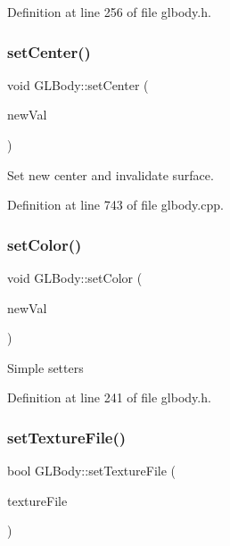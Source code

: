 Definition at line 256 of file glbody.\+h.

\mbox{\label{class_g_l_body_abb97f9928110d5bcd47c4488e92ac78e}} 
\subsubsection{\texorpdfstring{setCenter()}{setCenter()}}
{\footnotesize\ttfamily void G\+L\+Body\+::set\+Center (\begin{DoxyParamCaption}\item[{const Q\+Vector3D \&}]{new\+Val }\end{DoxyParamCaption})}

Set new center and invalidate surface. 

Definition at line 743 of file glbody.\+cpp.

\mbox{\label{class_g_l_body_a6101fd66bc1bfcd8dabed690b87c0d78}} 
\subsubsection{\texorpdfstring{setColor()}{setColor()}}
{\footnotesize\ttfamily void G\+L\+Body\+::set\+Color (\begin{DoxyParamCaption}\item[{const \mbox{\hyperlink{class_g_l_color_rgba}{G\+L\+Color\+Rgba}} \&}]{new\+Val }\end{DoxyParamCaption})\hspace{0.3cm}{\ttfamily [inline]}}

Simple setters 

Definition at line 241 of file glbody.\+h.

\mbox{\label{class_g_l_body_ac912257e45e99c68c011da7f2d5d3708}} 
\subsubsection{\texorpdfstring{setTextureFile()}{setTextureFile()}}
{\footnotesize\ttfamily bool G\+L\+Body\+::set\+Texture\+File (\begin{DoxyParamCaption}\item[{const Q\+String \&}]{texture\+File }\end{DoxyParamCaption})}

